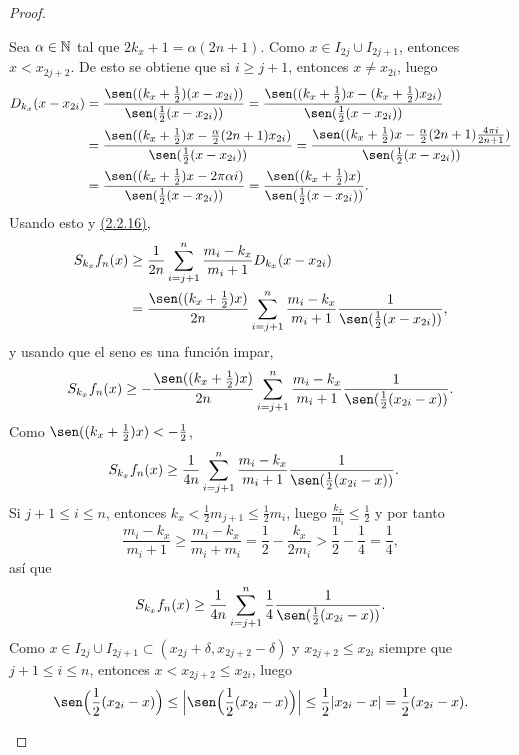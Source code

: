 \documentclass[a4paper, 12pt, oneside]{book}
\begin{document}
\begin{proof}
\begin{itemize}
        Sea $\alpha \in \mathbb N$ tal que $2k_x+1 = \alpha(2n+1)$. Como $x \in I_{2j} \cup I_{2j+1}$, entonces $x < x_{2j+2}$. De esto se obtiene que si $i \geq j+1$, entonces $x \neq x_{2i}$, luego
        \begin{align*}
            D_{k_x}(x-x_{2i}) &= \frac{\sen((k_x+\frac{1}{2})(x-x_{2i}))}{\sen(\frac{1}{2}(x-x_{2i}))} = \frac{\sen((k_x+\frac{1}{2})x-(k_x+\frac{1}{2})x_{2i})}{\sen(\frac{1}{2}(x-x_{2i}))} \\
            &= \frac{\sen((k_x+\frac{1}{2})x-\frac{\alpha}{2}(2n+1)x_{2i})}{\sen(\frac{1}{2}(x-x_{2i}))} = \frac{\sen((k_x+\frac{1}{2})x-\frac{\alpha}{2}(2n+1)\frac{4\pi i}{2n+1})}{\sen(\frac{1}{2}(x-x_{2i}))} \\
            &= \frac{\sen((k_x+\frac{1}{2})x-2\pi\alpha i)}{\sen(\frac{1}{2}(x-x_{2i}))} = \frac{\sen((k_x+\frac{1}{2})x)}{\sen(\frac{1}{2}(x-x_{2i}))}.
        \end{align*}
        Usando esto y \hyperref[2.2.16]{\color{blue}(2.2.16)},
        \begin{align*}
            S_{k_x}f_n(x) &\geq \frac{1}{2n}\sum_{i=j+1}^n \frac{m_i-k_x}{m_i+1}D_{k_x}(x-x_{2i}) \\
            &= \frac{\sen((k_x+\frac{1}{2})x)}{2n}\sum_{i=j+1}^n \frac{m_i-k_x}{m_i+1}\frac{1}{\sen(\frac{1}{2}(x-x_{2i}))},
        \end{align*}
        y usando que el seno es una función impar,
        \[S_{k_x}f_n(x) \geq -\frac{\sen((k_x+\frac{1}{2})x)}{2n}\sum_{i=j+1}^n \frac{m_i-k_x}{m_i+1}\frac{1}{\sen(\frac{1}{2}(x_{2i}-x))}.\]
        Como $\sen((k_x+\frac{1}{2})x) < -\frac{1}{2}$,
        \begin{align*}
            S_{k_x}f_n(x) &\geq \frac{1}{4n}\sum_{i=j+1}^n \frac{m_i-k_x}{m_i+1}\frac{1}{\sen(\frac{1}{2}(x_{2i}-x))}.
        \end{align*}
       Si $j+1 \leq i \leq n$, entonces $k_x < \frac{1}{2}m_{j+1} \leq \frac{1}{2}m_i$, luego $\frac{k_x}{m_i} \leq \frac{1}{2}$ y por tanto
            \[\frac{m_i-k_x}{m_i+1} \geq \frac{m_i-k_x}{m_i+m_i} = \frac{1}{2}-\frac{k_x}{2m_i} > \frac{1}{2}-\frac{1}{4} = \frac{1}{4},\]
        así que
        \[S_{k_x}f_n(x) \geq \frac{1}{4n}\sum_{i=j+1}^n \frac{1}{4}\frac{1}{\sen(\frac{1}{2}(x_{2i}-x))}.\]
        Como $x \in I_{2j} \cup I_{2j+1} \subset (x_{2j}+\delta,x_{2j+2}-\delta)$ y $x_{2j+2}\leq x_{2i}$ siempre que $j+1 \leq i \leq n$, entonces $x < x_{2j+2} \leq x_{2i}$, luego
        \[\sen\Bigl(\frac{1}{2}(x_{2i}-x)\Bigr) \leq \Bigl|\sen\Bigl(\frac{1}{2}(x_{2i}-x)\Bigr)\Bigr| \leq \frac{1}{2}|x_{2i}-x| = \frac{1}{2}(x_{2i}-x).\]

\end{itemize}
\end{proof}
\end{document}
